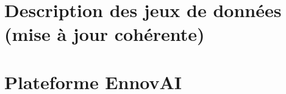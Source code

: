 ﻿\chapter{Description des jeux de données (mise à jour cohérente)}
\label{appendice:datasets}


\chapter{Plateforme EnnovAI}

